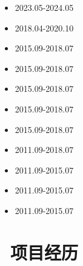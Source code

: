 \documentclass{resume}
\begin{document}
\begin{itemize} [parsep=0.5ex]

\item   {}                                {2023.05-2024.05}
\item   {}                                         {2018.04-2020.10}

\item   {}                                         {2015.09-2018.07}
\item   {}                                         {2015.09-2018.07}
\item   {}                                         {2015.09-2018.07}
\item   {}                                         {2015.09-2018.07}
\item   {}                                     {2015.09-2018.07}

\item   {}                                  {2011.09-2018.07}

\item   {}                                  {2011.09-2015.07}
\item   {}                                    {2011.09-2015.07}
\item   {}                                     {2011.09-2015.07}

\end{itemize}


\medskip










\section{   \faUsers    \ 项目经历}
\end{document}
